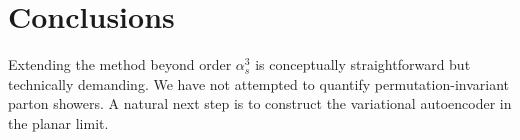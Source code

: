 \section{Conclusions}\label{sec:conclusions}

Extending the method beyond order $\alpha_s^3$ is conceptually
straightforward but technically demanding. We have not attempted to
quantify permutation-invariant parton showers. A natural next step is to
construct the variational autoencoder in the planar limit.

